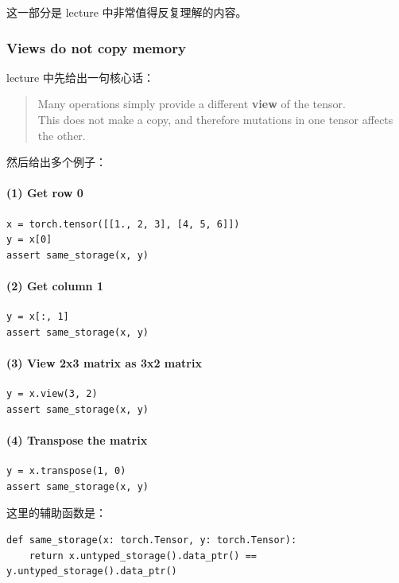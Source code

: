 \documentclass[a4paper,UTF8]{article}
\numberwithin{equation}{section}
\begin{document}
这一部分是 lecture 中非常值得反复理解的内容。

\subsubsection{Views do not copy memory}

lecture 中先给出一句核心话：
\begin{quote}
Many operations simply provide a different \textbf{view} of the tensor. \\
This does not make a copy, and therefore mutations in one tensor affects the other.
\end{quote}

然后给出多个例子：

\paragraph{(1) Get row 0}
\begin{verbatim}
x = torch.tensor([[1., 2, 3], [4, 5, 6]])
y = x[0]
assert same_storage(x, y)
\end{verbatim}

\paragraph{(2) Get column 1}
\begin{verbatim}
y = x[:, 1]
assert same_storage(x, y)
\end{verbatim}

\paragraph{(3) View 2x3 matrix as 3x2 matrix}
\begin{verbatim}
y = x.view(3, 2)
assert same_storage(x, y)
\end{verbatim}

\paragraph{(4) Transpose the matrix}
\begin{verbatim}
y = x.transpose(1, 0)
assert same_storage(x, y)
\end{verbatim}

这里的辅助函数是：
\begin{verbatim}
def same_storage(x: torch.Tensor, y: torch.Tensor):
    return x.untyped_storage().data_ptr() == y.untyped_storage().data_ptr()
\end{verbatim}
\end{document}

